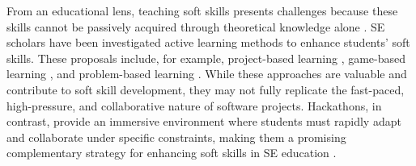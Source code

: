 

From an educational lens, teaching soft skills presents challenges because these skills cannot be passively acquired through theoretical knowledge alone \cite{martins2007role}. SE scholars have been investigated active learning methods to enhance students' soft skills. These proposals include, for example, project-based learning \cite{gonzalez2011teaching}, game-based learning \cite{garcia2020effects}, and problem-based learning \cite{yu2016developing}.  While these approaches are valuable and contribute to soft skill development, they may not fully replicate the fast-paced, high-pressure, and collaborative nature of software projects. Hackathons, in contrast, provide an immersive environment where students must rapidly adapt and collaborate under specific constraints, making them a promising complementary strategy for enhancing soft skills in SE education \cite{porras2018hackathons, steglich2021online}.





